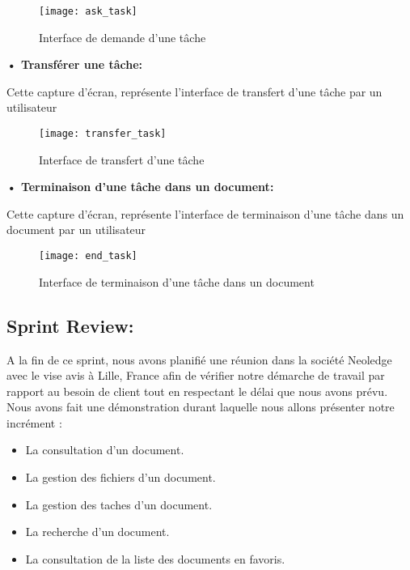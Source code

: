 \begin{figure}[H]
  \centering
  \texttt{[image: ask\_task]}
  \caption{Interface de demande d'une tâche}
  \label{fig:ask_task}
\end{figure}

\textbf{•	Transférer une tâche:}

Cette capture d'écran, représente l'interface de transfert d'une tâche par un utilisateur

\begin{figure}[H]
  \centering
  \texttt{[image: transfer\_task]}
  \caption{Interface de transfert d'une tâche}
  \label{fig:transfer_task}
\end{figure}

\textbf{•	Terminaison d'une tâche dans un document:}

Cette capture d'écran, représente l'interface de terminaison d'une tâche dans un document par un utilisateur

\begin{figure}[H]
  \centering
  \texttt{[image: end\_task]}
  \caption{Interface de terminaison d'une tâche dans un document}
  \label{fig:end_task}
\end{figure}




\subsection{Sprint Review:}
A la fin de ce sprint, nous avons planifié une réunion dans la société Neoledge avec le vise avis à Lille, France afin de vérifier notre démarche de travail par rapport au besoin de client tout en respectant le délai que nous avons prévu.
Nous avons fait une démonstration durant laquelle nous allons présenter notre incrément :
\begin{itemize}
  \item La consultation d'un document.
  \item La gestion des fichiers d'un document.
  \item La gestion des taches d'un document.
  \item La recherche d'un document.
  \item La consultation de la liste des documents en favoris.
\end{itemize}


